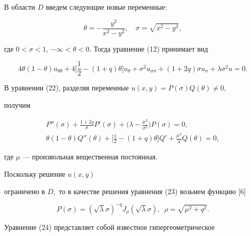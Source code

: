 В области $D$ введем следующие новые переменные:


\begin{equation}


\theta=-\frac{y^2}{x^2-y^2},\quad \sigma =\sqrt{x^2-y^2},


\end{equation}


где $0<\sigma<1$, $-\infty<\theta<0.$ Тогда уравнение (12) принимает вид


\begin{equation}


4\theta(1-\theta)u_{\theta\theta}+4\bigg[\frac{1}{2}-(1+q)\theta\bigg]


u_\theta+ \sigma^2u_{\sigma\sigma}+(1+2q)\sigma


u_\sigma+\lambda\sigma^2u=0.


\end{equation}


В уравнении (22), разделяя переменные $u(x,y)=P(\sigma)Q(\theta)\ne 0,$


получим


\begin{gather}


P''(\sigma)+\frac{1+2q}{\sigma}P'(\sigma)+\bigg(\lambda -


\frac{\mu^2}{\sigma^2}\bigg)P(\sigma)=0,\\


%


\theta(1-\theta)Q''(\theta)+\bigg[\frac{1}{2}-(1+q)\theta\bigg]Q'+


\frac{\mu^2}{4}Q(\theta)=0,


\end{gather}


где $\mu$ --- произвольная вещественная постоянная.





Поскольку решение $u(x,y)$


ограничено в $D,$ то в качестве решения уравнения (23) возьмем функцию [6]


\begin{equation}


P(\sigma)=(\sqrt\lambda\sigma)^{-q}J_\rho(\sqrt\lambda\sigma),\ \;\rho=


\sqrt{\mu^2+q^2}.


\end{equation}


Уравнение (24) представляет собой известное гипергеометрическое


